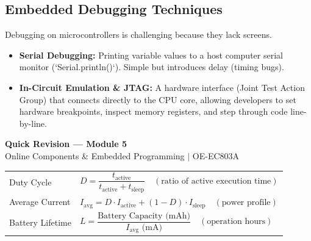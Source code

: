\documentclass[12pt,a4paper]{article}
\renewcommand{\arraystretch}{1.45}
\begin{document}
\subsection{Embedded Debugging Techniques}
Debugging on microcontrollers is challenging because they lack screens.
\begin{itemize}[leftmargin=*, itemsep=3pt]
  \item \textbf{Serial Debugging:} Printing variable values to a host computer serial monitor (`Serial.println()`). Simple but introduces delay (timing bugs).
  \item \textbf{In-Circuit Emulation \& JTAG:} A hardware interface (Joint Test Action Group) that connects directly to the CPU core, allowing developers to set hardware breakpoints, inspect memory registers, and step through code line-by-line.
\end{itemize}

\newpage

\begin{center}
  {\large\bfseries\color{myred} Quick Revision — Module 5}\\[3pt]
  {\small\color{mydark} Online Components \& Embedded Programming $|$ OE-EC803A}
\end{center}
\noindent{\color{myred}\rule{\linewidth}{1.2pt}}
\vspace{8pt}

\begin{tcolorbox}[formulabox, title={\textbf{Key Formulas and Metrics at a Glance}}]
\renewcommand{\arraystretch}{1.35}
\begin{tabularx}{\linewidth}{B{5.0cm} X}
  Duty Cycle & $D = \dfrac{t_{\text{active}}}{t_{\text{active}} + t_{\text{sleep}}} \quad (\text{ratio of active execution time})$ \\[4pt]
  Average Current & $I_{\text{avg}} = D \cdot I_{\text{active}} + (1 - D) \cdot I_{\text{sleep}} \quad (\text{power profile})$ \\[4pt]
  Battery Lifetime & $L = \dfrac{\text{Battery Capacity (mAh)}}{I_{\text{avg}} \text{ (mA)}} \quad (\text{operation hours})$
\end{tabularx}
\end{tcolorbox}

\vspace{6pt}
\end{document}

